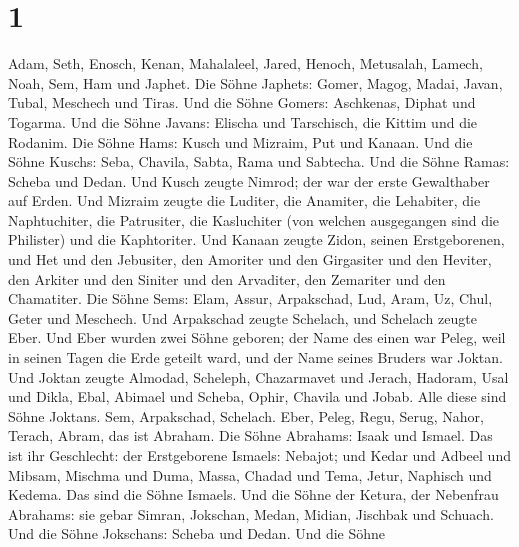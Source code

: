 \hypertarget{section}{%
\section{1}\label{section}}

 Adam, Seth, Enosch,  Kenan, Mahalaleel,
Jared,  Henoch, Metusalah, Lamech,  Noah,
Sem, Ham und Japhet.  Die Söhne Japhets: Gomer, Magog,
Madai, Javan, Tubal, Meschech und Tiras.  Und die Söhne
Gomers: Aschkenas, Diphat und Togarma.  Und die Söhne
Javans: Elischa und Tarschisch, die Kittim und die Rodanim.
 Die Söhne Hams: Kusch und Mizraim, Put und Kanaan.
 Und die Söhne Kuschs: Seba, Chavila, Sabta, Rama und
Sabtecha. Und die Söhne Ramas: Scheba und Dedan.  Und
Kusch zeugte Nimrod; der war der erste Gewalthaber auf Erden.
 Und Mizraim zeugte die Luditer, die Anamiter, die
Lehabiter, die Naphtuchiter, die Patrusiter, die Kasluchiter
 (von welchen ausgegangen sind die Philister) und die
Kaphtoriter.  Und Kanaan zeugte Zidon, seinen
Erstgeborenen,  und Het und den Jebusiter, den Amoriter
und den Girgasiter  und den Heviter, den Arkiter und den
Siniter und den Arvaditer,  den Zemariter und den
Chamatiter.  Die Söhne Sems: Elam, Assur, Arpakschad,
Lud, Aram, Uz, Chul, Geter und Meschech.  Und Arpakschad
zeugte Schelach, und Schelach zeugte Eber.  Und Eber
wurden zwei Söhne geboren; der Name des einen war Peleg, weil in seinen
Tagen die Erde geteilt ward, und der Name seines Bruders war Joktan.
 Und Joktan zeugte Almodad, Scheleph, Chazarmavet und
Jerach,  Hadoram, Usal und Dikla,  Ebal,
Abimael und Scheba, Ophir, Chavila und Jobab.  Alle diese
sind Söhne Joktans.  Sem, Arpakschad, Schelach.
 Eber, Peleg, Regu, Serug, Nahor,  Terach,
 Abram, das ist Abraham.  Die Söhne
Abrahams: Isaak und Ismael.  Das ist ihr Geschlecht: der
Erstgeborene Ismaels: Nebajot; und Kedar und Adbeel und Mibsam,
 Mischma und Duma, Massa, Chadad und Tema,
 Jetur, Naphisch und Kedema. Das sind die Söhne Ismaels.
 Und die Söhne der Ketura, der Nebenfrau Abrahams: sie
gebar Simran, Jokschan, Medan, Midian, Jischbak und Schuach. Und die
Söhne Jokschans: Scheba und Dedan.  Und die Söhne
